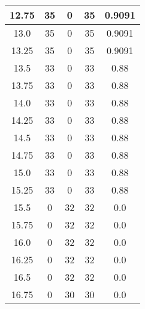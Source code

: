 \documentclass[letterpaper, 12pt]{article}
\begin{document}
\begin{longtable}{|c|c|c|c|c|}
\hline
12.75 & 35 & 0 & 35 & 0.9091 \\
\hline
13.0 & 35 & 0 & 35 & 0.9091 \\
\hline
13.25 & 35 & 0 & 35 & 0.9091 \\
\hline
13.5 & 33 & 0 & 33 & 0.88 \\
\hline
13.75 & 33 & 0 & 33 & 0.88 \\
\hline
14.0 & 33 & 0 & 33 & 0.88 \\
\hline
14.25 & 33 & 0 & 33 & 0.88 \\
\hline
14.5 & 33 & 0 & 33 & 0.88 \\
\hline
14.75 & 33 & 0 & 33 & 0.88 \\
\hline
15.0 & 33 & 0 & 33 & 0.88 \\
\hline
15.25 & 33 & 0 & 33 & 0.88 \\
\hline
15.5 & 0 & 32 & 32 & 0.0 \\
\hline
15.75 & 0 & 32 & 32 & 0.0 \\
\hline
16.0 & 0 & 32 & 32 & 0.0 \\
\hline
16.25 & 0 & 32 & 32 & 0.0 \\
\hline
16.5 & 0 & 32 & 32 & 0.0 \\
\hline
16.75 & 0 & 30 & 30 & 0.0 \\
\hline
\end{longtable}
\end{document}
